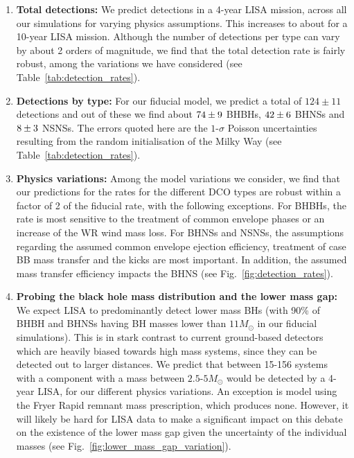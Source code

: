 \begin{enumerate}
    \item \textbf{Total detections:} We predict \rangeFourYear{} detections in a 4-year LISA mission, across all our simulations for varying physics assumptions. This increases to about \rangeTenYear{} for a 10-year LISA mission. Although the number of detections per type can vary by about 2 orders of magnitude, we find that the total detection rate is fairly robust, among the variations we have considered (see Table~\ref{tab:detection_rates}).
    
    \item \textbf{Detections by type:} For our fiducial model, we predict a total of $124 \pm 11$ detections and out of these we find about $74{}\pm 9$ BHBHs, $42{}\pm 6$ BHNSs and $8{}\pm 3$ NSNSs. The errors quoted here are the $1$-$\sigma$ Poisson uncertainties resulting from the random initialisation of the Milky Way (see Table~\ref{tab:detection_rates}).
    
    \item \textbf{Physics variations:} Among the model variations we consider, we find that our predictions for the rates for the different DCO types are robust within a factor of 2 of the fiducial rate, with the following exceptions. For BHBHs, the rate is most sensitive to the treatment of common envelope phases or an increase of the WR wind mass loss. For BHNSs and NSNSs, the assumptions regarding the assumed common envelope ejection efficiency, treatment of case BB mass transfer and the kicks are most important. In addition, the assumed mass transfer efficiency impacts the BHNS (see Fig.~\ref{fig:detection_rates}).
    
    \item \textbf{Probing the black hole mass distribution and the lower mass gap:} We expect LISA to predominantly detect lower mass BHs (with 90\% of BHBH and BHNSs having BH masses lower than $11 \unit{M_\odot}$ in our fiducial simulations). This is in stark contrast to current ground-based detectors which are heavily biased towards high mass systems, since they can be detected out to larger distances. We predict that between 15-156 systems with a component with a mass between $2.5$-$5 \unit{M_\odot}$ would be detected by a 4-year LISA, for our different physics variations. An exception is model using the Fryer Rapid remnant mass prescription, which produces none. However, it will likely be hard for LISA data to make a significant impact on this debate on the existence of the lower mass gap given the uncertainty of the individual masses (see Fig.~\ref{fig:lower_mass_gap_variation}).
    

\end{enumerate}
